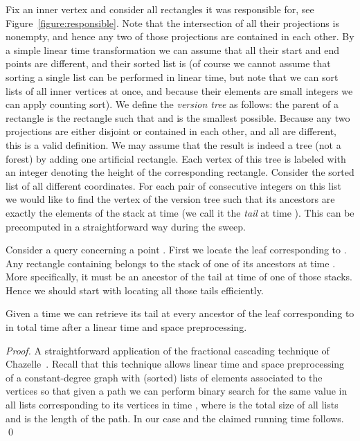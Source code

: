 \documentclass[runningheads]{llncs}
\begin{document}
Fix an inner vertex and consider all  rectangles it was responsible for, see Figure~\ref{figure:responsible}. Note that the intersection of
all their  projections is nonempty, and hence any two of those projections are contained in each other. By a simple linear time transformation we can assume that all their start and end points are different, and their sorted list is  (of course we cannot assume that sorting a single list can be performed in linear time, but note that we can sort lists of all inner vertices at once, and because their elements are small integers we can apply counting sort). We define the \emph{version tree} as follows: the parent of a rectangle  is the rectangle  such that  and  is the smallest possible. Because any two  projections are either disjoint or contained in each other, and all  are different, this is a valid definition. We
may assume that the result is indeed a tree (not a forest) by adding one artificial rectangle. Each vertex of this tree is labeled with an integer denoting the height  of the corresponding rectangle. Consider the sorted list of all different  coordinates. For each pair of consecutive
integers  on this list we would like to find the vertex of the version tree such that its ancestors are exactly the elements of the stack at time  (we call it the \emph{tail} at time ). This can be precomputed in a straightforward way during the sweep. 

Consider a query concerning a point . First we locate the leaf  corresponding to . Any rectangle containing  belongs to the
stack of one of its ancestors at time . More specifically, it must be an ancestor of the tail at time  of one of those  stacks. Hence
we should start with locating all those  tails efficiently.

\begin{lemma}\label{lemma:cascading}
Given a time  we can retrieve its tail at every ancestor of the leaf corresponding to  in total  time after a linear time and space preprocessing.
\end{lemma}

\begin{proof}
A straightforward application of the fractional cascading technique of Chazelle~\cite{Chazelle}. Recall that this technique allows linear time and
space preprocessing of a constant-degree graph with (sorted) lists of elements associated to the vertices so that given a path we can perform binary search for the same value in all lists corresponding to its vertices in time , where  is the total size of all lists and  is the length of the path. In our case  and the claimed running time follows.
\qed
\end{proof}
\end{document}

